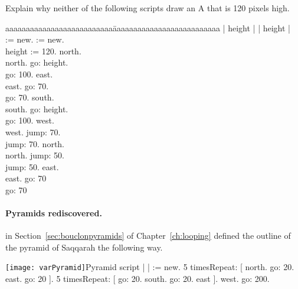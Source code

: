 \begin{exonofig}
Explain why \newcommand{\replace}[2]{none}{neither} of the following scripts \newcommand{\remove}[1]{do not} draw an A \newcommand{\replace}[2]{of}{that is} 120
\newcommand{\replace}[2]{pixel height}{pixels high}.
\begin{nalltt}
\begin{tabbing}
aaaaaaaaaaaaaaaaaaaaaaaaaa\=aaaaaaaaaaaaaaaaaaaaaaaaaa\kill
| \caro height |               \>| \caro height |       \\             
\caro := \Turtle new.         \>\caro := \Turtle new.\\
height := 120.                   \>\caro north.\\
\caro north.                      \>\caro go: height.\\
\caro go: 100.                      \>\caro east.\\
\caro east.                               \>\caro go: 70.\\
\caro go: 70.                               \>\caro south.\\
\caro south.                              \>\caro go: height.\\
\caro go: 100.                             \>\caro west.\\
\caro west.                                 \>\caro jump: 70.\\
\caro jump: 70.                            \>\caro north.\\
\caro north.                                  \>\caro jump: 50.\\
\caro jump: 50.                              \>\caro east.\\
\caro east.                                       \>\caro go: 70\\
\caro go: 70
\end{tabbing}
\end{nalltt}
\end{exonofig}

\paragraph{Pyramids rediscovered.} \newcommand{\replace}[2]{In}{ in} Section~\ref{sec:bouclonpyramids} of Chapter~\ref{ch:looping} \newcommand{\remove}[1]{in the \scriptref{scr:pyramid} 
we} defined the outline of the pyramid of Saqqarah the following way.

\begin{scriptfigwithsize}[.45]{\texttt{[image: varPyramid]}}{Pyramid script}
| \caro |
\caro := \Turtle new.
5 timesRepeat: 
               [ \caro north.
               \caro go: 20.
               \caro east.
               \caro go: 20 ].
5 timesRepeat: 
               [ \caro go: 20.
               \caro south.
               \caro go: 20.
               \caro east ].
\caro west.
\caro go: 200.
\end{scriptfigwithsize}



